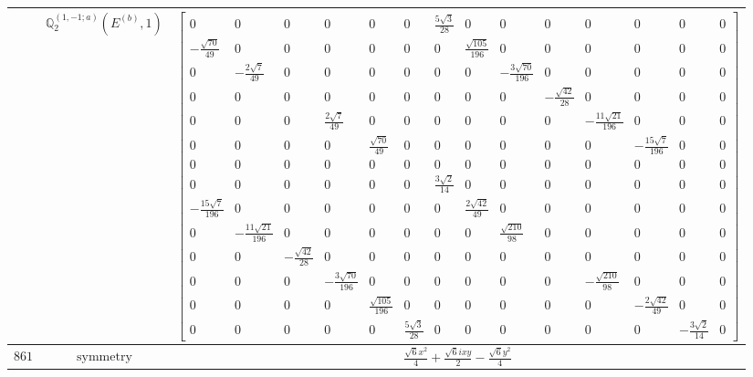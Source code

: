\documentclass[fleqn,8pt,landscape]{jsarticle}
\begin{document}
\begin{longtable}{ccc}
$  $ & $ \mathbb{Q}_{2}^{(1,-1;a)}(E^{(b)},1) $ & $ \begin{bmatrix} 0 & 0 & 0 & 0 & 0 & 0 & \frac{5 \sqrt{3}}{28} & 0 & 0 & 0 & 0 & 0 & 0 & 0 \\ - \frac{\sqrt{70}}{49} & 0 & 0 & 0 & 0 & 0 & 0 & \frac{\sqrt{105}}{196} & 0 & 0 & 0 & 0 & 0 & 0 \\ 0 & - \frac{2 \sqrt{7}}{49} & 0 & 0 & 0 & 0 & 0 & 0 & - \frac{3 \sqrt{70}}{196} & 0 & 0 & 0 & 0 & 0 \\ 0 & 0 & 0 & 0 & 0 & 0 & 0 & 0 & 0 & - \frac{\sqrt{42}}{28} & 0 & 0 & 0 & 0 \\ 0 & 0 & 0 & \frac{2 \sqrt{7}}{49} & 0 & 0 & 0 & 0 & 0 & 0 & - \frac{11 \sqrt{21}}{196} & 0 & 0 & 0 \\ 0 & 0 & 0 & 0 & \frac{\sqrt{70}}{49} & 0 & 0 & 0 & 0 & 0 & 0 & - \frac{15 \sqrt{7}}{196} & 0 & 0 \\ 0 & 0 & 0 & 0 & 0 & 0 & 0 & 0 & 0 & 0 & 0 & 0 & 0 & 0 \\ 0 & 0 & 0 & 0 & 0 & 0 & \frac{3 \sqrt{2}}{14} & 0 & 0 & 0 & 0 & 0 & 0 & 0 \\ - \frac{15 \sqrt{7}}{196} & 0 & 0 & 0 & 0 & 0 & 0 & \frac{2 \sqrt{42}}{49} & 0 & 0 & 0 & 0 & 0 & 0 \\ 0 & - \frac{11 \sqrt{21}}{196} & 0 & 0 & 0 & 0 & 0 & 0 & \frac{\sqrt{210}}{98} & 0 & 0 & 0 & 0 & 0 \\ 0 & 0 & - \frac{\sqrt{42}}{28} & 0 & 0 & 0 & 0 & 0 & 0 & 0 & 0 & 0 & 0 & 0 \\ 0 & 0 & 0 & - \frac{3 \sqrt{70}}{196} & 0 & 0 & 0 & 0 & 0 & 0 & - \frac{\sqrt{210}}{98} & 0 & 0 & 0 \\ 0 & 0 & 0 & 0 & \frac{\sqrt{105}}{196} & 0 & 0 & 0 & 0 & 0 & 0 & - \frac{2 \sqrt{42}}{49} & 0 & 0 \\ 0 & 0 & 0 & 0 & 0 & \frac{5 \sqrt{3}}{28} & 0 & 0 & 0 & 0 & 0 & 0 & - \frac{3 \sqrt{2}}{14} & 0 \end{bmatrix} $ \\ \hline
$ 861 $ & $ \text{symmetry} $ & $ \frac{\sqrt{6} x^{2}}{4} + \frac{\sqrt{6} i x y}{2} - \frac{\sqrt{6} y^{2}}{4} $ \\

\end{longtable}
\end{document}
